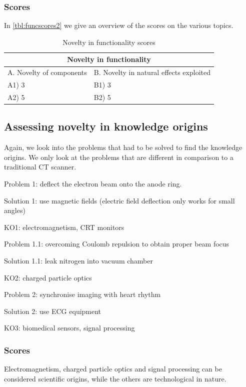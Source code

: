 \subsubsection{Scores}
In \autoref{tbl:funcscores2} we give an overview of the scores on the various
topics.

\begin{table}[h]
\centering
\begin{tabular}{l l}
\hline
\multicolumn{2}{|c|}{Novelty in functionality} \\
\hline
A. Novelty of components & B. Novelty in natural effects exploited\\
A1) 3 & B1) 3\\ 
A2) 5 & B2) 5\\ 
\hline
\end{tabular}
\caption{Novelty in functionality scores}
\label{tbl:funcscores2}
\end{table}

\subsection{Assessing novelty in knowledge origins}
Again, we look into the problems that had to be solved to find the knowledge
origins. We only look at the problems that are different in comparison to a
traditional CT scanner.

Problem 1: deflect the electron beam onto the anode ring.

Solution 1: use magnetic fields (electric field deflection only works for small angles)

KO1: electromagnetism, CRT monitors

Problem 1.1: overcoming Coulomb repulsion to obtain proper beam focus

Solution 1.1: leak nitrogen into vacuum chamber \cite{ebctelectric}

KO2: charged particle optics

Problem 2: synchronise imaging with heart rhythm

Solution 2: use ECG equipment

KO3: biomedical sensors, signal processing

\subsubsection{Scores}
Electromagnetism, charged particle optics and signal processing can be
considered scientific origins, while the others are technological in nature.

